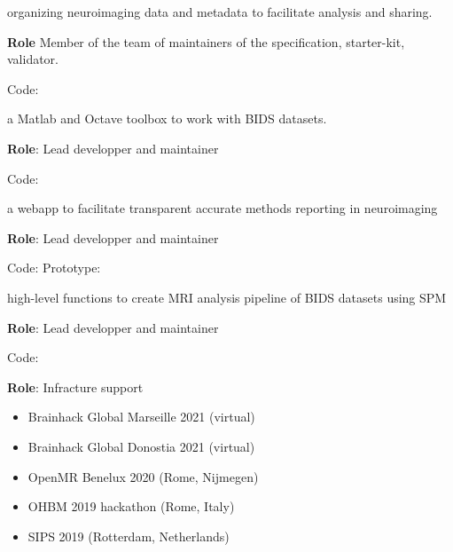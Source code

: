 
 organizing neuroimaging data and metadata to facilitate analysis and sharing.
    
\textbf{Role} Member of the team of maintainers of the specification, starter-kit, validator.

\textbullet Code: 

\vspace{5mm}


 a Matlab and Octave toolbox to work with BIDS datasets.
    
\textbf{Role}: Lead developper and maintainer

\textbullet Code: 

\vspace{5mm}


 a webapp to facilitate transparent accurate methods reporting in neuroimaging

\textbf{Role}: Lead developper and maintainer

\textbullet Code:  
\textbullet {}
\textbullet Prototype: 

\vspace{5mm}


 high-level functions to create MRI analysis pipeline of BIDS datasets using SPM

\textbf{Role}: Lead developper and maintainer

\textbullet Code: 

\vspace{5mm}



\textbf{Role}: Infracture support


\vspace{5mm}

    


\begin{itemize}
    \item Brainhack Global Marseille 2021 (virtual) 
    \item Brainhack Global Donostia 2021 (virtual) 
    \item OpenMR Benelux 2020 (Rome, Nijmegen) 
    \item OHBM 2019 hackathon (Rome, Italy) 
\end{itemize}

\begin{itemize}
    \item SIPS 2019 (Rotterdam, Netherlands) 
\end{itemize}
